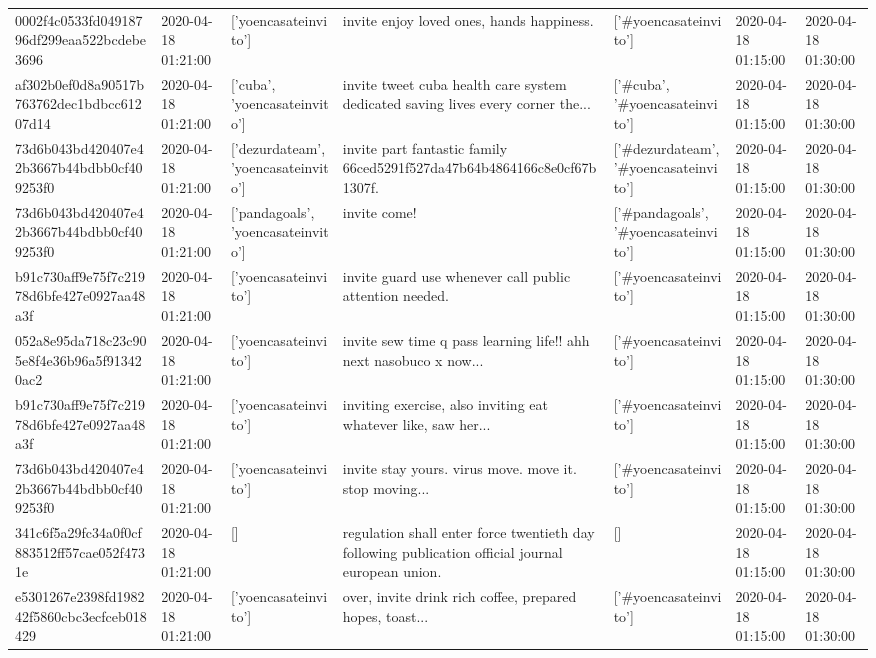 \begin{tabular}{lllllll}
0002f4c0533fd04918796df299eaa522bcdebe3696 & 2020-04-18 01:21:00 & ['yoencasateinvito'] & invite enjoy loved ones, hands happiness. & ['#yoencasateinvito'] & 2020-04-18 01:15:00 & 2020-04-18 01:30:00 \\
af302b0ef0d8a90517b763762dec1bdbcc61207d14 & 2020-04-18 01:21:00 & ['cuba', 'yoencasateinvito'] & invite tweet cuba health care system dedicated saving lives every corner the... & ['#cuba', '#yoencasateinvito'] & 2020-04-18 01:15:00 & 2020-04-18 01:30:00 \\
73d6b043bd420407e42b3667b44bdbb0cf409253f0 & 2020-04-18 01:21:00 & ['dezurdateam', 'yoencasateinvito'] & invite part fantastic family 66ced5291f527da47b64b4864166c8e0cf67b1307f. & ['#dezurdateam', '#yoencasateinvito'] & 2020-04-18 01:15:00 & 2020-04-18 01:30:00 \\
73d6b043bd420407e42b3667b44bdbb0cf409253f0 & 2020-04-18 01:21:00 & ['pandagoals', 'yoencasateinvito'] & invite come! & ['#pandagoals', '#yoencasateinvito'] & 2020-04-18 01:15:00 & 2020-04-18 01:30:00 \\
b91c730aff9e75f7c21978d6bfe427e0927aa48a3f & 2020-04-18 01:21:00 & ['yoencasateinvito'] & invite guard use whenever call public attention needed. & ['#yoencasateinvito'] & 2020-04-18 01:15:00 & 2020-04-18 01:30:00 \\
052a8e95da718c23c905e8f4e36b96a5f913420ac2 & 2020-04-18 01:21:00 & ['yoencasateinvito'] & invite sew time q pass learning life!! ahh next nasobuco x now... & ['#yoencasateinvito'] & 2020-04-18 01:15:00 & 2020-04-18 01:30:00 \\
b91c730aff9e75f7c21978d6bfe427e0927aa48a3f & 2020-04-18 01:21:00 & ['yoencasateinvito'] & inviting exercise, also inviting eat whatever like, saw her... & ['#yoencasateinvito'] & 2020-04-18 01:15:00 & 2020-04-18 01:30:00 \\
73d6b043bd420407e42b3667b44bdbb0cf409253f0 & 2020-04-18 01:21:00 & ['yoencasateinvito'] & invite stay yours. virus move. move it. stop moving... & ['#yoencasateinvito'] & 2020-04-18 01:15:00 & 2020-04-18 01:30:00 \\
341c6f5a29fc34a0f0cf883512ff57cae052f4731e & 2020-04-18 01:21:00 & [] & regulation shall enter force twentieth day following publication official journal european union. & [] & 2020-04-18 01:15:00 & 2020-04-18 01:30:00 \\
e5301267e2398fd198242f5860cbc3ecfceb018429 & 2020-04-18 01:21:00 & ['yoencasateinvito'] & over, invite drink rich coffee, prepared hopes, toast... & ['#yoencasateinvito'] & 2020-04-18 01:15:00 & 2020-04-18 01:30:00 \\

\end{tabular}
